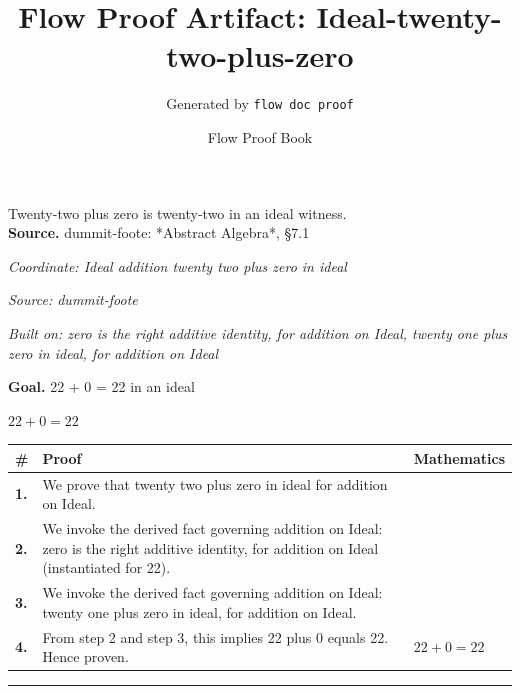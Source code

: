 \documentclass[11pt]{article}
\title{Flow Proof Artifact: Ideal-twenty-two-plus-zero}
\author{Generated by \texttt{flow doc proof}}
\date{Flow Proof Book}
\theoremstyle{definition}
\begin{document}
\maketitle
Twenty-two plus zero is twenty-two in an ideal witness.\\[0.5em]
\textbf{Source.} dummit-foote: *Abstract Algebra*, §7.1\\[0.5em]
\bigskip
{}\par
\smallskip\noindent\textit{Coordinate: Ideal \cdot addition \cdot twenty two plus zero in ideal}\par
\smallskip\noindent\textit{Source: dummit-foote}\par
\smallskip\noindent\textit{Built on: zero is the right additive identity, for addition on Ideal, twenty one plus zero in ideal, for addition on Ideal}\par
\medskip
\noindent\textbf{Goal.} 22 + 0 = 22 in an ideal\par
\noindent$\displaystyle 22 + 0 = 22$\par
\medskip
\noindent
\begin{tabular}{@{} >{\raggedright\arraybackslash}p{} >{\raggedright\arraybackslash}p{} >{\raggedleft\arraybackslash}p{} @{}}
\textbf{\#} & \textbf{Proof} & \textbf{Mathematics} \\
\midrule
\textbf{1.} & We prove that twenty two plus zero in ideal for addition on Ideal. & \\[0.45em]
\textbf{2.} & We invoke the derived fact governing addition on Ideal: zero is the right additive identity, for addition on Ideal (instantiated for 22). & \\[0.45em]
\textbf{3.} & We invoke the derived fact governing addition on Ideal: twenty one plus zero in ideal, for addition on Ideal. & \\[0.45em]
\textbf{4.} & From step 2 and step 3, this implies 22 plus 0 equals 22. Hence proven. & $\displaystyle 22 + 0 = 22$ \\[0.45em]
\bottomrule
\end{tabular}
\label{thm:Ideal-addition-twenty_two_plus_zero_in_ideal}
\par\medskip\hrule
\end{document}
